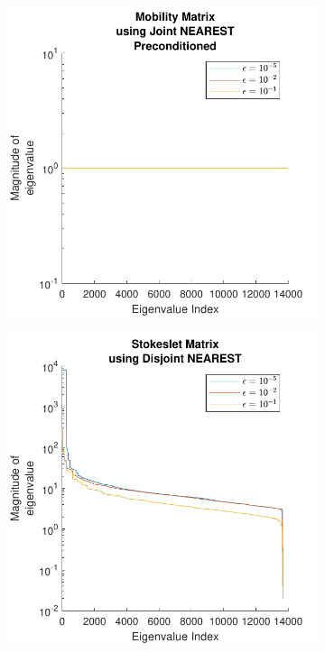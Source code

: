 \begin{figure}
\ContinuedFloat
    \begin{subfigure}{0.45\textwidth}
        \centering
        \includegraphics[width=\linewidth]{Images/Condition/Eigen-Mobility Matrix using Joint NEAREST Preconditioned.pdf}
    \end{subfigure}
    \hfill
    \begin{subfigure}{0.45\textwidth}
        \centering
        \includegraphics[width=\linewidth]{Images/Condition/Eigen-Stokeslet Matrix using Disjoint NEAREST.pdf}
    \end{subfigure}
\end{figure}
